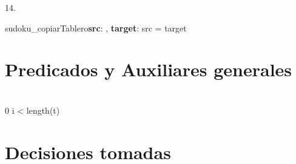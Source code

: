 \documentclass[a4paper]{article}
\begin{document}
14. \begin{proc}{sudoku\_copiarTablero}{\textbf{\In src}: \matriz{\ent}, \textbf{\Out target}: \matriz{\ent}}{}{}
       \pre{\True}
       \post
			{
			src = target
			}
    \end{proc}



\section{Predicados y Auxiliares generales}

	
		
			
		{\\
			0 \leq  i < length(t)\\
		}
		
	
		
        
		
\section{Decisiones tomadas}
\end{document}

